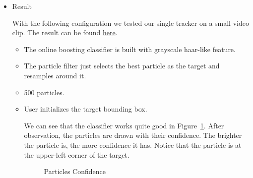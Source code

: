 \documentclass[a4paper]{article}
\begin{document}
\begin{enumerate}
\begin{itemize}
\begin{itemize}
\end{itemize}

\item Result

With the following configuration we tested our single tracker on a small video clip. The result can be found \href{https://zerowong.github.io/PedestrainCounting/results/singleTrackerTest01.avi}{here}.

\begin{itemize}

\item The online boosting classifier is built with grayscale haar-like feature.
\item The particle filter just selects the best particle as the target and resamples around it.
\item 500 particles.
\item User initializes the target bounding box.

We can see that the classifier works quite good in Figure~\ref{fig:particlesConfidence}. After observation, the particles are drawn with their confidence. The brighter the particle is, the more confidence it has. Notice that the particle is at the upper-left corner of the target.

\begin{figure}[htb]
    \begin{center}
    \end{center}
    \caption{Particles Confidence}
    \label{fig:particlesConfidence}
\end{figure}


\end{itemize}
\end{itemize}
\end{enumerate}
\end{document}
